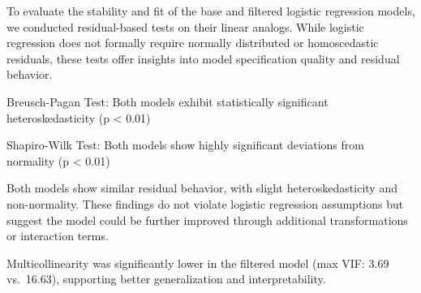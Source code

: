 \documentclass[
  letterpaper,
  DIV=11,
  numbers=noendperiod]{scrartcl}
\newenvironment{Shaded}{\begin{snugshade}}{\end{snugshade}}
\newcommand{\AttributeTok}[1]{\textcolor[rgb]{0.40,0.45,0.13}{#1}}
\newcommand{\CommentTok}[1]{\textcolor[rgb]{0.37,0.37,0.37}{#1}}
\newcommand{\FunctionTok}[1]{\textcolor[rgb]{0.28,0.35,0.67}{#1}}
\newcommand{\NormalTok}[1]{\textcolor[rgb]{0.00,0.23,0.31}{#1}}
\newcommand{\OtherTok}[1]{\textcolor[rgb]{0.00,0.23,0.31}{#1}}
\newcommand{\SpecialCharTok}[1]{\textcolor[rgb]{0.37,0.37,0.37}{#1}}
\newcommand{\StringTok}[1]{\textcolor[rgb]{0.13,0.47,0.30}{#1}}
\begin{document}
To evaluate the stability and fit of the base and filtered logistic
regression models, we conducted residual-based tests on their linear
analogs. While logistic regression does not formally require normally
distributed or homoscedastic residuals, these tests offer insights into
model specification quality and residual behavior.

Breusch-Pagan Test: Both models exhibit statistically significant
heteroskedasticity (p \textless{} 0.01)

Shapiro-Wilk Test: Both models show highly significant deviations from
normality (p \textless{} 0.01)

Both models show similar residual behavior, with slight
heteroskedasticity and non-normality. These findings do not violate
logistic regression assumptions but suggest the model could be further
improved through additional transformations or interaction terms.

Multicollinearity was significantly lower in the filtered model (max
VIF: 3.69 vs.~16.63), supporting better generalization and
interpretability.

\begin{Shaded}
\end{Shaded}
\end{document}
